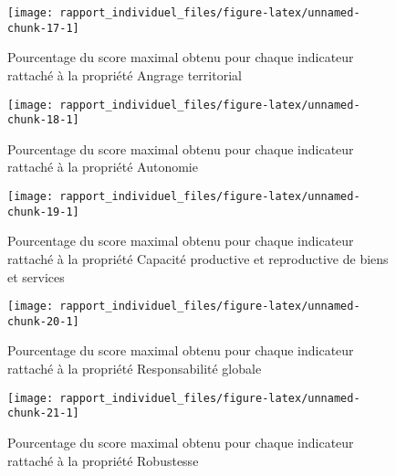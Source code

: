 \documentclass[13pt,]{article}
\begin{document}
\begin{figure}[H]

{\centering \texttt{[image: rapport\_individuel\_files/figure-latex/unnamed-chunk-17-1]} 

}

\caption{Pourcentage du score maximal obtenu pour chaque indicateur rattaché à la propriété Angrage territorial}\label{fig:unnamed-chunk-17}
\end{figure}

\begin{figure}[H]

{\centering \texttt{[image: rapport\_individuel\_files/figure-latex/unnamed-chunk-18-1]} 

}

\caption{Pourcentage du score maximal obtenu pour chaque indicateur rattaché à la propriété Autonomie}\label{fig:unnamed-chunk-18}
\end{figure}

\begin{figure}[H]

{\centering \texttt{[image: rapport\_individuel\_files/figure-latex/unnamed-chunk-19-1]} 

}

\caption{Pourcentage du score maximal obtenu pour chaque indicateur rattaché à la propriété Capacité productive et reproductive de biens et services}\label{fig:unnamed-chunk-19}
\end{figure}

\begin{figure}[H]

{\centering \texttt{[image: rapport\_individuel\_files/figure-latex/unnamed-chunk-20-1]} 

}

\caption{Pourcentage du score maximal obtenu pour chaque indicateur rattaché à la propriété Responsabilité globale}\label{fig:unnamed-chunk-20}
\end{figure}

\begin{figure}[H]

{\centering \texttt{[image: rapport\_individuel\_files/figure-latex/unnamed-chunk-21-1]} 

}

\caption{Pourcentage du score maximal obtenu pour chaque indicateur rattaché à la propriété Robustesse}\label{fig:unnamed-chunk-21}
\end{figure}
\end{document}
